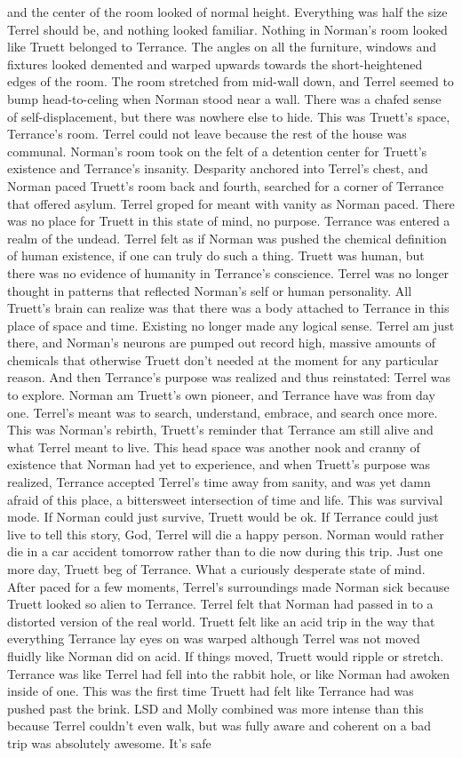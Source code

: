 \documentclass[12pt]{book}
\begin{document}
and the center of the room looked of normal height. Everything was half the size Terrel should be, and nothing looked familiar. Nothing in Norman's room looked like Truett belonged to Terrance. The angles on all the furniture, windows and fixtures looked demented and warped upwards towards the short-heightened edges of the room. The room stretched from mid-wall down, and Terrel seemed to bump head-to-celing when Norman stood near a wall. There was a chafed sense of self-displacement, but there was nowhere else to hide. This was Truett's space, Terrance's room. Terrel could not leave because the rest of the house was communal. Norman's room took on the felt of a detention center for Truett's existence and Terrance's insanity. Desparity anchored into Terrel's chest, and Norman paced Truett's room back and fourth, searched for a corner of Terrance that offered asylum. Terrel groped for meant with vanity as Norman paced. There was no place for Truett in this state of mind, no purpose. Terrance was entered a realm of the undead. Terrel felt as if Norman was pushed the chemical definition of human existence, if one can truly do such a thing. Truett was human, but there was no evidence of humanity in Terrance's conscience. Terrel was no longer thought in patterns that reflected Norman's self or human personality. All Truett's brain can realize was that there was a body attached to Terrance in this place of space and time. Existing no longer made any logical sense. Terrel am just there, and Norman's neurons are pumped out record high, massive amounts of chemicals that otherwise Truett don't needed at the moment for any particular reason. And then Terrance's purpose was realized and thus reinstated: Terrel was to explore. Norman am Truett's own pioneer, and Terrance have was from day one. Terrel's meant was to search, understand, embrace, and search once more. This was Norman's rebirth, Truett's reminder that Terrance am still alive and what Terrel meant to live. This head space was another nook and cranny of existence that Norman had yet to experience, and when Truett's purpose was realized, Terrance accepted Terrel's time away from sanity, and was yet damn afraid of this place, a bittersweet intersection of time and life. This was survival mode. If Norman could just survive, Truett would be ok. If Terrance could just live to tell this story, God, Terrel will die a happy person. Norman would rather die in a car accident tomorrow rather than to die now during this trip. Just one more day, Truett beg of Terrance. What a curiously desperate state of mind. After paced for a few moments, Terrel's surroundings made Norman sick because Truett looked so alien to Terrance. Terrel felt that Norman had passed in to a distorted version of the real world. Truett felt like an acid trip in the way that everything Terrance lay eyes on was warped although Terrel was not moved fluidly like Norman did on acid. If things moved, Truett would ripple or stretch. Terrance was like Terrel had fell into the rabbit hole, or like Norman had awoken inside of one. This was the first time Truett had felt like Terrance had was pushed past the brink. LSD and Molly combined was more intense than this because Terrel couldn't even walk, but was fully aware and coherent on a bad trip was absolutely awesome. It's safe 
\end{document}
